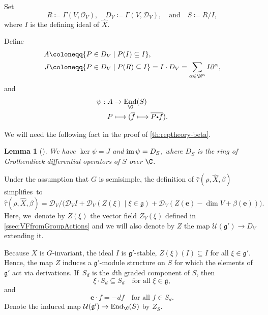 \documentclass[JEP,XML,SOM,Unicode,published]{cedram}
\newcommand\mto{\mathchoice{\longmapsto}{\mapsto}{\mapsto}{\mapsto}}
\newcommand{\sbullet}{{\scriptscriptstyle\bullet}}
\newcommand{\csbullet}{{\raisebox{1pt}{$\sbullet$}}}
\newcommand{\quand}{\quad\text{and}\quad}
\newcommand{\bme}{{\boldsymbol{e}}}
\newtheorem{lem}[thm]{Lemma}
\newcommand{\frg}{\mathfrak{g}}
\DeclareMathOperator{\End}{\textup{End}}
\DeclareMathOperator{\im}{\textup{im}}
\begin{document}
Set
\[
R\coloneqq \Gamma(V, \mathcal{O}_V), \quad D_V \coloneqq \Gamma(V, \mathscr{D}_V),\quand S\coloneqq R/I,
\]
where $I$ is the defining ideal of $\hat{X}$.

Define
\begin{equation}\label{eq:subAlg}
\begin{aligned}
A &\coloneqq \{P\in D_V \mid P(I) \subseteq I\},\\
J &\coloneqq \{P\in D_V \mid P(R) \subseteq I\} = I\cdot D_V=\sum_{\alpha\in \N^n} I\partial^\alpha,\\
\end{aligned}
\end{equation}
and
\begin{equation}\label{eq:MapPsi}
\begin{aligned}
\psi:A&\to\End_\C(S) \\
P&\mto(\overline{f}\mto\overline{P\csbullet f}).
\end{aligned}
\end{equation}

We will need the following fact in the proof of \cref{th:reptheory-beta}.

\begin{lem}[{\cite[Prop.\,1.6.]{SmithStafford}}]\label{milicic-ker}
We have $\ker\psi=J$ and $\im\psi=D_S$, where $D_S$ is the ring of Grothendieck differential operators of $S$ over $\C$.
\end{lem}

Under the assumption that $G$ is semisimple, the definition of $\hat\tau(\rho, \hat{X},\beta)$ simplifies~to
\[
\hat\tau(\rho, \hat{X}, \beta) = \mathscr{D}_V/\bigl(\mathscr{D}_VI + \mathscr{D}_V(Z(\xi) \mid \xi \in \mathfrak{g}) + \mathscr{D}_V(Z(\bme)-\dim V + \beta(\bme))\bigr).
\]
Here, we~denote by $Z(\xi)$ the vector field $Z_V(\xi)$ defined in \cref{ssec:VFfromGroupActions} and we will also denote by $Z$ the map $\mathcal U(\frg') \to D_V$ extending it.

Because $X$ is $G$-invariant, the ideal $I$ is $\mathfrak{g}'$-stable, \ie $Z(\xi)(I)\subseteq I$ for all $\xi\in \mathfrak{g}'$. Hence, the map $Z$ induces a $\mathfrak{g}'$\nobreakdash-mod\-ule structure on $S$ for which the elements of $\mathfrak{g}'$ act via derivations. If~$S_d$ is the $d$th graded component of $S$, then
\[
\xi\cdot S_d \subseteq S_d \quad \text{for all }\xi \in \mathfrak{g},
\]
and
\begin{equation}\label{eq:eul-scales}
\bme\cdot f = -df\quad\text{for all }f\in S_d.
\end{equation}
Denote the induced map $\mathcal{U}(\mathfrak{g}') \to \End_\C(S)$ by $Z_S$.
\end{document}
